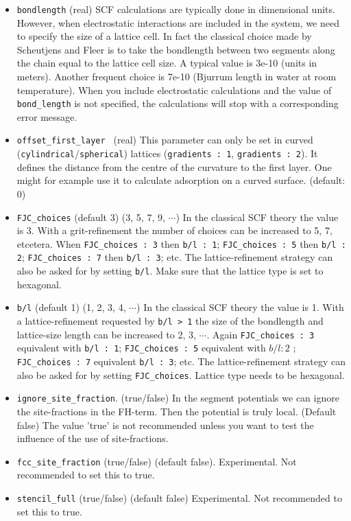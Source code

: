 \documentclass{article}
\begin{document}
\begin{itemize}
\item {\tt bondlength} (real) SCF calculations are typically done in dimensional units. However, when electrostatic interactions are included in the system, we need to specify the size of a lattice cell. In fact the classical choice made by Scheutjens and Fleer is to take the bondlength between two segments along the chain equal to the lattice cell size. A typical value is 3e-10 (units in meters). Another frequent choice is 7e-10 (Bjurrum length in water at room temperature). When you include electrostatic calculations and the value of {\tt bond\_length} is not specified, the calculations will stop with a corresponding error message. 

\item {\tt offset\_first\_layer } (real) This parameter can only be set in curved ({\tt cylindrical}/{\tt spherical}) lattices ({\tt gradients : 1}, {\tt gradients : 2}). It defines the distance from the centre of the curvature to the first layer. One might for example use it to calculate adsorption on a curved surface.  (default: 0)

\item {\tt FJC\_choices} (default 3) (3, 5, 7, 9, $\cdots$) In the classical SCF theory the value is 3. With a grit-refinement the number of choices can be increased to 5, 7, etcetera. When {\tt FJC\_choices : 3} then {\tt b/l : 1};   {\tt FJC\_choices : 5} then {\tt b/l : 2}; {\tt FJC\_choices : 7} then {\tt b/l : 3}; etc. The lattice-refinement strategy can also be asked for by setting {\tt b/l}. Make sure that the lattice type is set to hexagonal.

\item {\tt b/l} (default 1) (1, 2, 3, 4, $\cdots$) In the classical SCF theory the value is 1. With a lattice-refinement requested by {\tt b/l > 1} the size of the bondlength and lattice-size length can be increased to 2, 3, $\cdots$. Again {\tt FJC\_choices : 3} equivalent with {\tt b/l : 1};   {\tt FJC\_choices : 5} equivalent with $b/l:2$ ; {\tt FJC\_choices : 7} equivalent {\tt b/l : 3}; etc. The lattice-refinement strategy can also be asked for by setting {\tt FJC\_choices}. Lattice type needs to be hexagonal. 

\item {\tt ignore\_site\_fraction}. (true/false) In the segment potentials we can ignore the site-fractions in the FH-term. Then the potential is truly local. (Default false) The value 'true' is not recommended unless you want to test the influence of the use of site-fractions.

\item {\tt fcc\_site\_fraction} (true/false) (default false). Experimental. Not recommended to set this to true.

\item {\tt stencil\_full} (true/false) (default false) Experimental. Not recommended to set this to true. 
\end{itemize}
\end{document}
